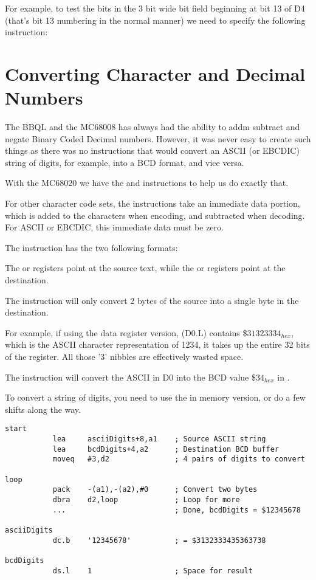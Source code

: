 For example, to test the bits in the 3 bit wide bit field beginning at bit 13 of D4 (that's bit 13 numbering in the normal manner) we need to specify the following instruction:




\section{Converting Character and Decimal Numbers}

The BBQL and the MC68008 has always had the ability to addm subtract and negate Binary Coded Decimal numbers. However, it was never easy to create such things as there was no instructions that would convert an ASCII (or EBCDIC) string of digits, for example, into a BCD format, and vice versa.

With the MC68020 we have the  and  instructions to help us do exactly that.

For other character code sets, the instructions take an immediate data portion, which is added to the characters when encoding, and subtracted when decoding. For ASCII or EBCDIC, this immediate data must be zero.

The  instruction has the two following formats:


The  or  registers point at the source text, while the  or  registers point at the destination.

The instruction will only convert 2 bytes of the source into a single byte in the destination.

For example, if using the data register version, \opcode(D0.L) contains \$$31323334_{hex}$, which is the ASCII character representation of 1234, it takes up the entire 32 bits of the register. All those '3' nibbles are effectively wasted space.

The instruction  will convert the ASCII in D0 into the BCD value \$$34_{hex}$ in . 

To convert a string of digits, you need to use the in memory version, or do a few shifts along the way.

\begin{lstlisting}[firstnumber=1,caption={Example of the PACK instruction}]
start
           lea     asciiDigits+8,a1    ; Source ASCII string
           lea     bcdDigits+4,a2      ; Destination BCD buffer
           moveq   #3,d2               ; 4 pairs of digits to convert
           
loop
           pack    -(a1),-(a2),#0      ; Convert two bytes
           dbra    d2,loop             ; Loop for more
           ...                         ; Done, bcdDigits = $12345678
           
asciiDigits
           dc.b    '12345678'          ; = $3132333435363738
           
bcdDigits
           ds.l    1                   ; Space for result
\end{lstlisting}

